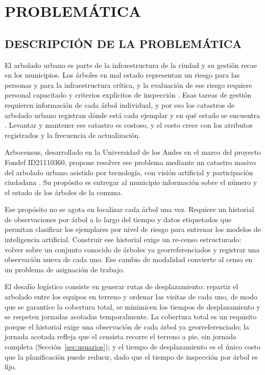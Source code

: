\chapter{PROBLEMÁTICA}
\label{cap:problematica}

\section{DESCRIPCIÓN DE LA PROBLEMÁTICA}

El arbolado urbano es parte de la infraestructura de la ciudad y su gestión recae en los municipios.
Los árboles en mal estado representan un riesgo para las personas y para la infraestructura crítica,
y la evaluación de ese riesgo requiere personal capacitado y criterios explícitos de inspección
\citep{klein2019risk}. Esas tareas de gestión requieren información de cada árbol individual, y por
eso los catastros de arbolado urbano registran dónde está cada ejemplar y en qué estado se encuentra
\citep{nielsen2014review}. Levantar y mantener ese catastro es costoso, y el costo crece con los
atributos registrados y la frecuencia de actualización.

Arbocensus, desarrollado en la Universidad de los Andes en el marco del proyecto Fondef ID21110360,
propone resolver ese problema mediante un catastro masivo del arbolado urbano asistido por
tecnología, con visión artificial y participación ciudadana
\citep{binder-cortes2023,pizarro-zumaeta2024}. Su propósito es entregar al municipio
información sobre el número y el estado de los árboles de la comuna.

Ese propósito no se agota en localizar cada árbol una vez. Requiere un historial de observaciones
por árbol a lo largo del tiempo \citep{pizarro-zumaeta2024} y
datos etiquetados que permitan clasificar los ejemplares por nivel de riesgo
para entrenar los modelos de inteligencia artificial. Construir ese historial exige un re-censo
estructurado: volver sobre un conjunto conocido de árboles ya georreferenciados y registrar una
observación nueva de cada uno. Ese cambio de modalidad convierte al censo en un problema de
asignación de trabajo.

El desafío logístico consiste en generar rutas de desplazamiento: repartir el arbolado entre los
equipos en terreno y ordenar las visitas de cada uno, de modo que se garantice la cobertura total,
se minimicen los tiempos de desplazamiento y se respeten jornadas acotadas temporalmente.
La cobertura total es un requisito porque
el historial exige una observación de cada árbol ya georreferenciado; la jornada acotada refleja que
el censista recorre el terreno a pie, sin jornada completa (Sección~\ref{sec:usuarios}); y el tiempo de
desplazamiento es el único costo que la planificación puede reducir, dado que el tiempo de
inspección por árbol es fijo.

